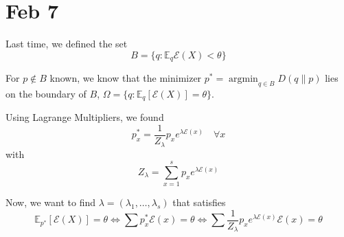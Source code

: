 \documentclass[12pt]{report}
\newcommand{\E}{\mathbb{E}}
\newcommand{\Ec}{\mathcal{E}}
\DeclareMathOperator*{\argmin}{\arg\min}
\begin{document}
\section{Feb 7}
Last time, we defined the set
\[B = \{q: \E_q \Ec(X) < \theta\}\]

For $p \notin B$ known, we know that the minimizer $p^* = \argmin_{q\in B} D(q \parallel p)$ lies on the boundary of $B$, $\Omega = \{q: \E_q [\Ec(X)] = \theta\}$.

Using Lagrange Multipliers, we found
\[p_x^* = \frac{1}{Z_{\lambda}} p_x  e^{\lambda \Ec(x)} \quad \forall x\]
with
\[Z_{\lambda} = \sum_{x=1}^{s} p_xe^{\lambda \Ec(x)}\]

Now, we want to find $\lambda = (\lambda_1, \dots, \lambda_s)$ that satisfies
\[\E_{p^*}[\Ec(X)] = \theta \iff \sum p_x^* \Ec(x) = \theta \iff \sum \frac{1}{Z_{\lambda}} p_x e^{\lambda \Ec(x)} \Ec(x) = \theta\]
\end{document}
